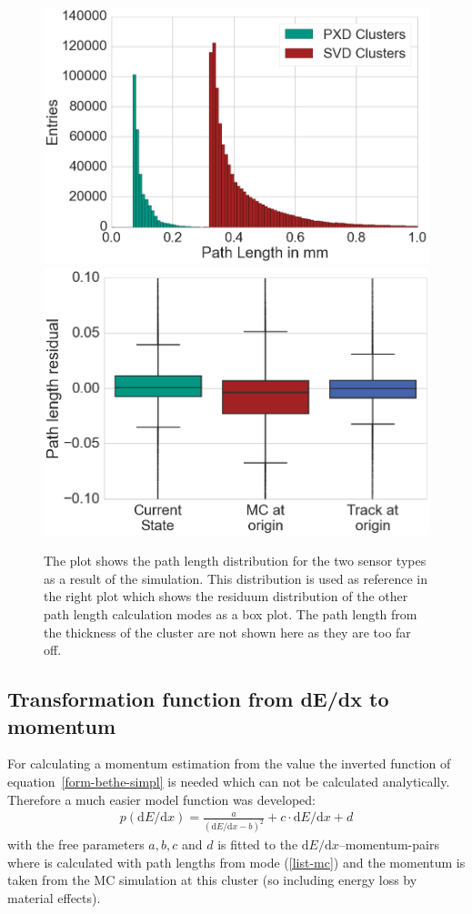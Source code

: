 \begin{figure}
 \centering
 \includegraphics[width=0.48\linewidth]{figures/vxd/pathLengths.png}
 \includegraphics[width=0.48\linewidth]{figures/vxd/box_plot.png}
 \caption[Path length distribution for the two sensor types.]{The plot shows the path length distribution for the two sensor types as a result of the simulation. This distribution is used as reference in the right plot which shows the residuum distribution of the other path length calculation modes as a box plot\footnotemark. The path length from the thickness of the cluster are not shown here as they are too far off.}
 \label{fig-pathlengths}
\end{figure}

\subsection{Transformation function from dE/dx to momentum} \label{subsection-transform}

For calculating a momentum estimation from the \dedx value the inverted function of equation~\ref{form-bethe-simpl} is needed which can not be calculated analytically. Therefore a much easier model function was developed:
\begin{align}
 p(\mathrm{d}E/\mathrm{d} x) = \frac{a}{(\mathrm{d}E/\mathrm{d} x - b)^2} + c \cdot \mathrm{d}E/\mathrm{d} x + d \label{form-model}
\end{align}
with the free parameters $a, b, c$ and $d$ is fitted to the $\mathrm d E / \mathrm d x$--momentum-pairs where \dedx is calculated with path lengths from mode (\ref{list-mc}) and the momentum is taken from the MC simulation at this cluster (so including energy loss by material effects).


